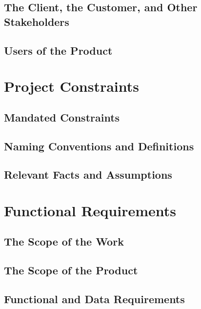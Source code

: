 \documentclass{scrreprt}
\begin{document}
\section{The Client, the Customer, and Other Stakeholders}

\section{Users of the Product}

\chapter{Project Constraints}

\section{Mandated Constraints}

\section{Naming Conventions and Definitions}

\section{Relevant Facts and Assumptions}

\chapter{Functional Requirements}

\section{The Scope of the Work}

\section{The Scope of the Product}

\section{Functional and Data Requirements}
\end{document}
